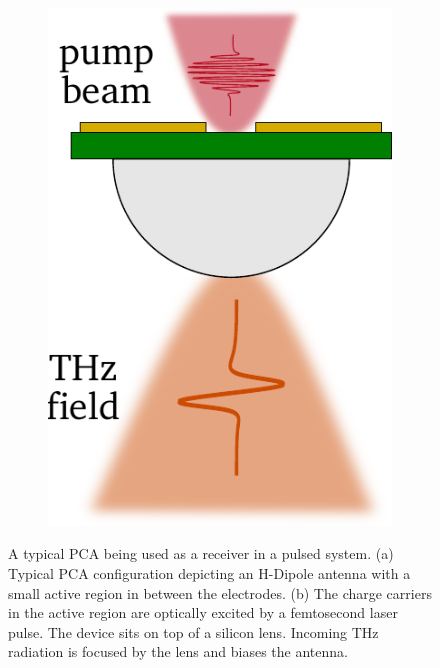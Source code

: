 \begin{figure}[!]
\begin{minipage}{0.75\textwidth}
\begin{subfigure}[t]{0.45\textwidth}
            \label{fig:typPCAantenna}
        \end{subfigure}
        \hfill
        \begin{subfigure}[t]{0.45\textwidth}
            \centering
            \includegraphics[height=0.32\textheight]{figures/typ_PCA_bias.pdf}
            \caption{\centering}
            \label{fig:typPCAbias}
        \end{subfigure}
        \caption{A typical PCA being used as a receiver in a pulsed system. (a) Typical PCA configuration depicting an H-Dipole antenna with a small active region in between the electrodes. (b) The charge carriers in the active region are optically excited by a femtosecond laser pulse. The device sits on top of a silicon lens. Incoming THz radiation is focused by the lens and biases the antenna.}
        \label{fig:typPCA}
    \end{minipage}
\end{figure}



